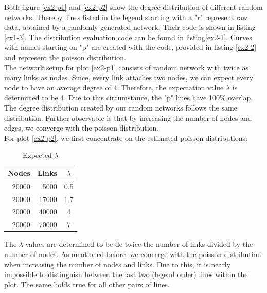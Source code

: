 \documentclass[10pt,a4paper]{article}
\begin{document}
\begin{enumerate}
Both figure \ref{ex2-p1} and \ref{ex2-p2} show the degree distribution of different random networks. Thereby, lines listed in the legend starting with a {"}r{"} represent raw data, obtained by a randomly generated network. Their code is shown in listing \ref{ex1-3}. The distribution evaluation code can be found in listing\ref{ex2-1}. Curves with names starting on {"}p{"} are created with the code, provided in listing \ref{ex2-2} and represent the poisson distribution.\\
The network setup for plot \ref{ex2-p1} consists of random network with twice as many links as nodes. Since, every link attaches two nodes, we can expect every node to have an average degree of 4. Therefore, the expectation value $\lambda$ is determined to be 4. Due to this circumstance, the {"}p{"} lines have 100{\%} overlap. The degree distribution created by our random networks follows the same distribution. Further observable is that by increasing the number of nodes and edges, we converge with the poisson distribution.\\
For plot \ref{ex2-p2}, we first concentrate on the estimated poisson distributions:\\
\begin{table}
	\caption{Expected $\lambda$}
	\label{ex2-lambda}
	\begin{tabular}{|r|r|c|}
	\hline 
	Nodes & Links & $\lambda$\\
	\hline \hline
	20000 & 5000 & 0.5\\
	\hline
	20000 & 17000 & 1.7\\
	\hline
	20000 & 40000 & 4\\
	\hline
	20000 & 70000 & 7\\
	\hline
	\end{tabular}
The $\lambda$ values are determined to be de twice the number of links divided by the number of nodes. As mentioned before, we concerge with the poisson distribution when increasing the number of nodes and links. Due to this, it is nearly impossible to distinguish between the last two (legend order) lines within the plot. The same holds true for all other pairs of lines.
\end{table}



\end{enumerate}
\end{document}
